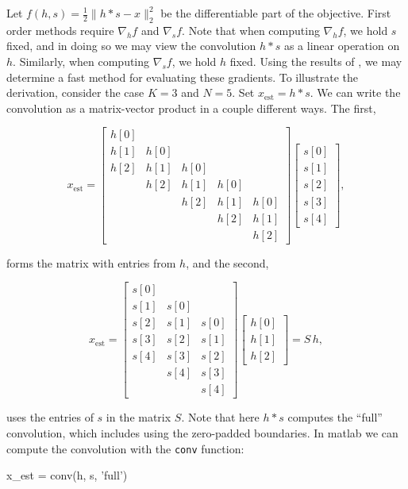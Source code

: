 \documentclass[journal]{IEEEtran}
\begin{document}
Let $f(h,s)=\frac{1}{2}\|h\ast s -x\|_2^2$ be the differentiable part of the objective.  First order methods require $\nabla_hf$ and $\nabla_sf$.  Note that when computing $\nabla_hf$, we hold $s$ fixed, and in doing so we may view the convolution $h\ast s$ as a linear operation on $h$.  Similarly, when computing $\nabla_s f$, we hold $h$ fixed.  Using the results of \cite{claerbout_1992}, we may determine a fast method for evaluating these gradients.  To illustrate the derivation, consider the case $K=3$ and $N=5$.  Set $x_\text{est}=h\ast s$.  We can write the convolution as a matrix-vector product in a couple different ways.  The first,

\[ x_\text{est} = \begin{bmatrix} h[0]\\h[1]&h[0]\\h[2]&h[1]&h[0]\\&h[2]&h[1]&h[0]\\&&h[2]&h[1]&h[0]\\&&&h[2]&h[1]\\&&&&h[2]\end{bmatrix}\begin{bmatrix}s[0]\\s[1]\\s[2]\\s[3]\\s[4]\end{bmatrix}, \] 

\noindent forms the matrix with entries from $h$, and the second,

\[ x_\text{est} = \begin{bmatrix} s[0]\\s[1]&s[0]\\s[2]&s[1]&s[0]\\s[3]&s[2]&s[1]\\s[4]&s[3]&s[2]\\&s[4]&s[3]\\&&s[4]\end{bmatrix}\begin{bmatrix}h[0]\\h[1]\\h[2]\end{bmatrix}
= S\, h, \] 

\noindent uses the entries of $s$ in the matrix $S$.  Note that here $h\ast s$ computes the ``full'' convolution, which includes using the zero-padded boundaries.  In {\sc matlab} we can compute the convolution with the \verb|conv| function:

\begin{verb}
  x_est = conv(h, s, 'full')
\end{verb}
\end{document}
